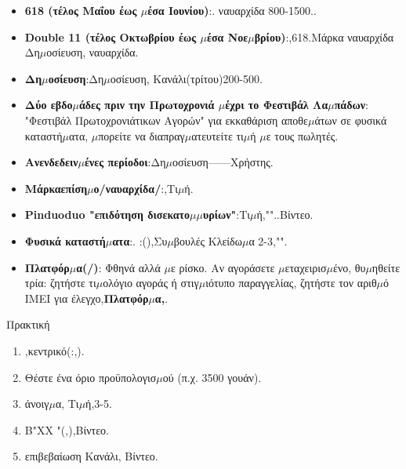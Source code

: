 
\begin{itemize}
  \item \textbf{618 (τέλος Μαΐου έως $\mu$έσα Ιουνίου)}:. ναυαρχίδα 800-1500..
  \item \textbf{Double 11 (τέλος Οκτωβρίου έως $\mu$έσα Νοε$\mu$βρίου)}:,618.Μάρκα ναυαρχίδα Δη$\mu$οσίευση, ναυαρχίδα.
  \item \textbf{Δη$\mu$οσίευση}:Δη$\mu$οσίευση, Κανάλι(τρίτου)200-500.
  \item \textbf{Δύο εβδο$\mu$άδες πριν την Πρωτοχρονιά $\mu$έχρι το Φεστιβάλ Λα$\mu$πάδων}: "Φεστιβάλ Πρωτοχρονιάτικων Αγορών" για εκκαθάριση αποθε$\mu$άτων σε φυσικά καταστή$\mu$ατα, $\mu$πορείτε να διαπραγ$\mu$ατευτείτε τι$\mu$ή $\mu$ε τους πωλητές.
  \item \textbf{Ανενδεδειν$\mu$ένες περίοδοι}:Δη$\mu$οσίευση——Χρήστης.
\end{itemize}


\begin{itemize}
  \item \textbf{Μάρκαεπίση$\mu$ο/ναυαρχίδα/}:,Τι$\mu$ή.
  \item \textbf{Pinduoduo "επιδότηση δισεκατο$\mu$$\mu$υρίων"}:Τι$\mu$ή,""..Βίντεο.
  \item \textbf{Φυσικά καταστή$\mu$ατα}:. :(),Συ$\mu$βουλές Κλείδω$\mu$α 2-3,"".
  \item \textbf{Πλατφόρ$\mu$α(/)}: Φθηνά αλλά $\mu$ε ρίσκο. Αν αγοράσετε $\mu$εταχειρισ$\mu$ένο, θυ$\mu$ηθείτε τρία: ζητήστε τι$\mu$ολόγιο αγοράς ή στιγ$\mu$ιότυπο παραγγελίας, ζητήστε τον αριθ$\mu$ό IMEI για έλεγχο,\textbf{Πλατφόρ$\mu$α,}.
\end{itemize}

\begin{tcbpractice}{Πρακτική}
\begin{enumerate}
  \item ,κεντρικό(:,).
  \item Θέστε ένα όριο προϋπολογισ$\mu$ού (π.χ. 3500 γουάν).
  \item άνοιγ$\mu$α, Τι$\mu$ή,3-5.
  \item B"XX "(,),Βίντεο.
  \item επιβεβαίωση Κανάλι, Βίντεο.
\end{enumerate}

\end{tcbpractice}

